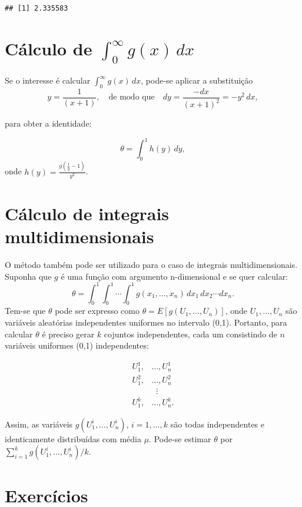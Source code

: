 \documentclass[
]{book}
\begin{document}
\begin{verbatim}
## [1] 2.335583
\end{verbatim}

\section{\texorpdfstring{Cálculo de \(\int_{0}^{\infty}g(x)\, dx\)}{Cálculo de \textbackslash int\_\{0\}\^{}\{\textbackslash infty\}g(x)\textbackslash, dx}}\label{cuxe1lculo-de-int_0inftygx-dx}

Se o interesse é calcular \(\int_{0}^{\infty}g(x)\, dx\), pode-se aplicar
a substituição
\[y=\frac{1}{(x+1)}, \quad \text{de modo que} \quad dy=\frac{-dx}{(x+1)^2}=-y^2\,dx,\]

para obter a identidade:

\[\theta = \int_{0}^{1}h(y)\,dy,\] onde
\(h(y)=\frac{g(\frac{1}{y}-1)}{y^2}\).

\section{Cálculo de integrais multidimensionais}\label{cuxe1lculo-de-integrais-multidimensionais}

O método também pode ser utilizado para o caso de integrais
multidimensionais. Suponha que \(g\) é uma função com argumento
n-dimensional e se quer calcular:
\[\theta = \int_{0}^{1}\int_{0}^{1}\cdots \int_{0}^{1} g(x_1, \ldots,x_n)\, dx_1 \, dx_2\cdots dx_n.\]
Tem-se que \(\theta\) pode ser expresso como
\(\theta = E[g(U_1,\ldots,U_n)]\), onde \(U_1,\ldots,U_n\) são variáveis
aleatórias independentes uniformes no intervalo (0,1). Portanto, para
calcular \(\theta\) é preciso gerar \(k\) cojuntos independentes, cada um
consistindo de \(n\) variáveis uniformes (0,1) independentes:

\begin{align*}
U_{1}^{1},&\ldots,U_{n}^{1} \\
U_{1}^{2},&\ldots,U_{n}^{2} \\
& \;\;\vdots \\
U_{1}^{k},&\ldots,U_{n}^{k}.
\end{align*}

Assim, as variáveis \(g(U_{1}^{i},\ldots, U_{n}^{i})\), \(i=1,\ldots,k\) são
todas independentes e identicamente distribuídas com média \(\mu\).
Pode-se estimar \(\theta\) por
\(\sum_{i=1}^{k}g(U_{1}^{i},\ldots, U_{n}^{i})/k\).

\section{Exercícios}\label{exercuxedcios-20}
\end{document}
